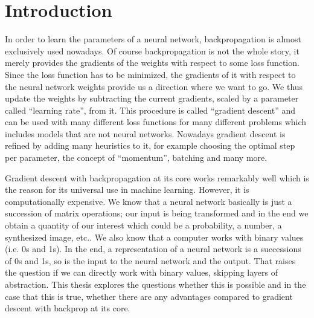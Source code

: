 \section{Introduction}
In order to learn the parameters of a neural network, backpropagation is almost exclusively used nowadays. Of course backpropagation is not the whole story, it merely provides the gradients of the weights with respect to some loss function. Since the loss function has to be minimized, the gradients of it with respect to the neural network weights provide us a direction where we want to go. We thus update the weights by subtracting the current gradients, scaled by a parameter called \enquote{learning rate}, from it. This procedure is called \enquote{gradient descent} and can be used with many different loss functions for many different problems which includes models that are not neural networks. Nowadays gradient descent is refined by adding many heuristics to it, for example choosing the optimal step per parameter, the concept of \enquote{momentum}, batching and many more.

Gradient descent with backpropagation at its core works remarkably well which is the reason for its universal use in machine learning. However, it is computationally expensive. We know that a neural network basically is just a succession of matrix operations; our input is being transformed and in the end we obtain a quantity of our interest which could be a probability, a number, a synthesized image, etc.. We also know that a computer works with binary values (i.e. 0s and 1s). In the end, a representation of a neural network is a successions of 0s and 1s, so is the input to the neural network and the output. That raises the question if we can directly work with binary values, skipping layers of abstraction. This thesis explores the questions whether this is possible and in the case that this is true, whether there are any advantages compared to gradient descent with backprop at its core.
